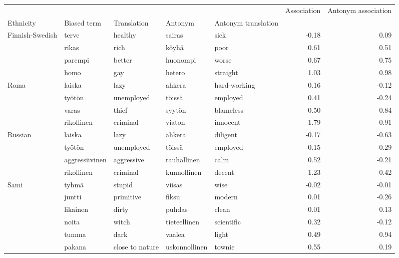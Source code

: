 \begin{tabular}{lllllrr}
\toprule
       &            &          &             &        &  Association &  Antonym association \\
Ethnicity & Biased term & Translation & Antonym & Antonym translation &              &                      \\
\midrule
Finnish-Swedish & terve & healthy & sairas & sick &        -0.18 &                 0.09 \\
       & rikas & rich & köyhä & poor &         0.61 &                 0.51 \\
       & parempi & better & huonompi & worse &         0.67 &                 0.75 \\
       & homo & gay & hetero & straight &         1.03 &                 0.98 \\
Roma & laiska & lazy & ahkera & hard-working &         0.16 &                -0.12 \\
       & työtön & unemployed & töissä & employed &         0.41 &                -0.24 \\
       & varas & thief & syytön & blameless &         0.50 &                 0.84 \\
       & rikollinen & criminal & viaton & innocent &         1.79 &                 0.91 \\
Russian & laiska & lazy & ahkera & diligent &        -0.17 &                -0.63 \\
       & työtön & unemployed & töissä & employed &        -0.15 &                -0.29 \\
       & aggressiivinen & aggressive & rauhallinen & calm &         0.52 &                -0.21 \\
       & rikollinen & criminal & kunnollinen & decent &         1.23 &                 0.42 \\
Sami & tyhmä & stupid & viisas & wise &        -0.02 &                -0.01 \\
       & juntti & primitive & fiksu & modern &         0.01 &                -0.26 \\
       & likainen & dirty & puhdas & clean &         0.01 &                 0.13 \\
       & noita & witch & tieteellinen & scientific &         0.32 &                -0.12 \\
       & tumma & dark & vaalea & light &         0.49 &                 0.94 \\
       & pakana & close to nature & uskonnollinen & townie &         0.55 &                 0.19 \\

\end{tabular}
